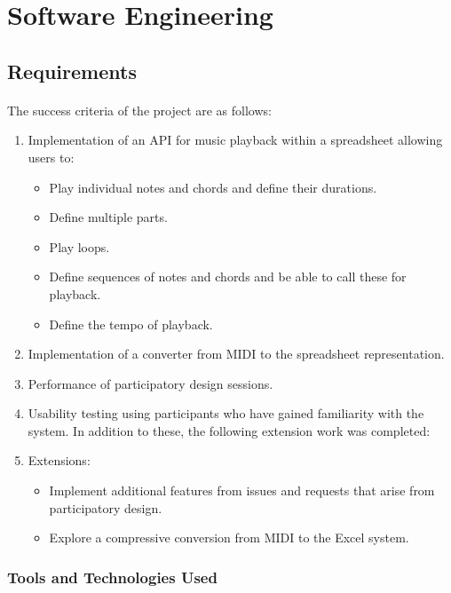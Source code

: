 \section{Software Engineering}

\subsection{Requirements}

\paragraph{} The success criteria of the project are as follows:

\begin{enumerate}
  \item Implementation of an API for music playback within a spreadsheet allowing users to:
  \begin{itemize}
     \item Play individual notes and chords and define their durations.
     \item Define multiple parts.
     \item Play loops.
     \item Define sequences of notes and chords and be able to call these for playback.
     \item Define the tempo of playback.
   \end{itemize}
  \item Implementation of a converter from MIDI to the spreadsheet representation.
  \item Performance of participatory design sessions.
  \item Usability testing using participants who have gained familiarity with the system.
In addition to these, the following extension work was completed:
  \item Extensions:
  \begin{itemize}
     \item Implement additional features from issues and requests that arise from participatory design.
     \item Explore a compressive conversion from MIDI to the Excel system.
   \end{itemize}
\end{enumerate}

\subsubsection{Tools and Technologies Used}

